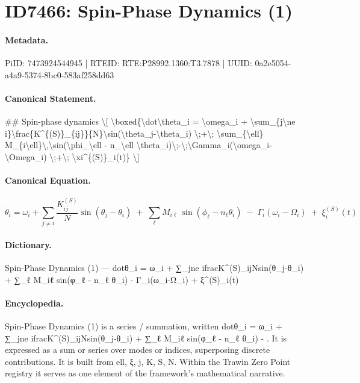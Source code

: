 \section*{ID7466: Spin-Phase Dynamics (1)}
\paragraph{Metadata.}
PiID: 7473924544945 | RTEID: RTE:P28992.1360:T3.7878 | UUID: 0a2e5054-a4a9-5374-8bc0-583af258dd63

\paragraph{Canonical Statement.}
\#\# Spin-phase dynamics \textbackslash{}[ \textbackslash{}boxed\{\textbackslash{}dot\textbackslash{}theta\_i = \textbackslash{}omega\_i + \textbackslash{}sum\_\{j\textbackslash{}ne i\}\textbackslash{}frac\{K\textasciicircum{}\{(S)\}\_\{ij\}\}\{N\}\textbackslash{}sin(\textbackslash{}theta\_j-\textbackslash{}theta\_i) \textbackslash{};+\textbackslash{}; \textbackslash{}sum\_\{\textbackslash{}ell\} M\_\{i\textbackslash{}ell\}\textbackslash{},\textbackslash{}sin(\textbackslash{}phi\_\textbackslash{}ell - n\_\textbackslash{}ell \textbackslash{}theta\_i)\textbackslash{};-\textbackslash{};\textbackslash{}Gamma\_i(\textbackslash{}omega\_i-\textbackslash{}Omega\_i) \textbackslash{};+\textbackslash{}; \textbackslash{}xi\textasciicircum{}\{(S)\}\_i(t)\} \textbackslash{}]

\paragraph{Canonical Equation.}
\[
\boxed{\dot\theta_i = \omega_i + \sum_{j\ne i}\frac{K^{(S)}_{ij}}{N}\sin(\theta_j-\theta_i) \;+\; \sum_{\ell} M_{i\ell}\,\sin(\phi_\ell - n_\ell \theta_i)\;-\;\Gamma_i(\omega_i-\Omega_i) \;+\; \xi^{(S)}_i(t)}
\]

\paragraph{Dictionary.}
Spin-Phase Dynamics (1) — dotθ\_i = ω\_i + ∑\_jne ifracK\textasciicircum{}(S)\_ijNsin(θ\_j-θ\_i) + ∑\_ℓ M\_iℓ sin(φ\_ℓ - n\_ℓ θ\_i) - Γ\_i(ω\_i-Ω\_i) + ξ\textasciicircum{}(S)\_i(t)

\paragraph{Encyclopedia.}
Spin-Phase Dynamics (1) is a series / summation, written dotθ\_i = ω\_i + ∑\_jne ifracK\textasciicircum{}(S)\_ijNsin(θ\_j-θ\_i) + ∑\_ℓ M\_iℓ sin(φ\_ℓ - n\_ℓ θ\_i) - . It is expressed as a sum or series over modes or indices, superposing discrete contributions. It is built from ell, ξ, j, K, S, N. Within the Trawin Zero Point registry it serves as one element of the framework's mathematical narrative.
